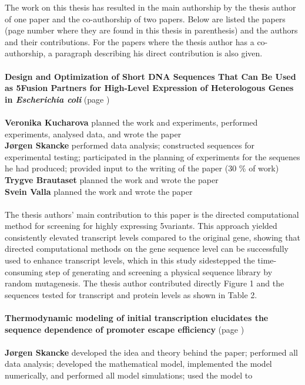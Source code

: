 The work on this thesis has resulted in the main authorship by the thesis
author of one paper and the co-authorship of two papers. Below are listed the
papers (page number where they are found in this thesis in parenthesis) and the
authors and their contributions. For the papers where the thesis author has a
co-authorship, a paragraph describing his direct contribution is also given.
\\
\\
\textbf{Design and Optimization of Short DNA Sequences That Can Be Used as
5\protect\ppp Fusion Partners for High-Level Expression of Heterologous Genes
in \textit{Escherichia coli}} (page \pageref{vero_paper})\\
\\
\textbf{Veronika Kucharova} planned the work and experiments, performed
experiments, analysed data, and wrote the paper\\
\textbf{J\o rgen Skancke} performed data analysis; constructed
sequences for experimental testing; participated in the planning of experiments
for the sequenes he had produced; provided input to the writing of the
paper (30 \% of work)\\
\textbf{Trygve Brautaset} planned the work and wrote the paper\\
\textbf{Svein Valla} planned the work and wrote the paper\\
\\
The thesis authors' main contribution to this paper is the directed
computational method for screening for highly expressing 5\ppp variants. This
approach yielded consistently elevated transcript levels compared to the
original gene, showing that directed computational methods on the gene sequence
level can be successfully used to enhance transcript levels, which in this
study sidestepped the time-consuming step of generating and screening a
physical sequence library by random mutagenesis. The thesis author contributed
directly Figure 1 and the sequences tested for transcript and protein levels as
shown in Table 2.
\\
\\
\textbf{Thermodynamic modeling of initial transcription elucidates the
sequence dependence of promoter escape efficiency} (page \pageref{chap:initiation_paper})\\
\\
\textbf{J\o rgen Skancke} developed the idea and theory behind the paper;
performed all data analysis; developed the mathematical model, implemented the
model numerically, and performed all model simulations; used the model to

